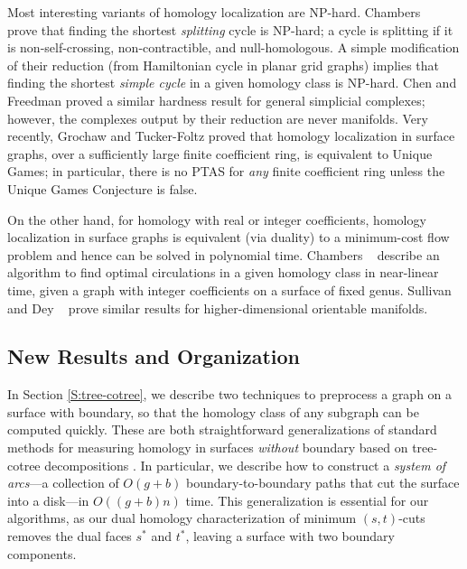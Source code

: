 \documentclass[11pt,twoside]{article}
\begin{document}
Most interesting variants of homology localization are NP-hard.  Chambers \etal~\cite{ccelw-scsih-08} prove that finding the shortest \emph{splitting} cycle is {NP}-hard; a cycle is splitting if it is non-self-crossing, non-contractible, and null-homologous.  A simple modification of their reduction (from Hamiltonian cycle in planar grid graphs) implies that finding the shortest \emph{simple cycle} in a given homology class is {NP}-hard.  Chen and Freedman \cite{cf-qhc-08, cf-qhc2-07} proved a similar hardness result for general simplicial complexes; however, the complexes output by their reduction are never manifolds.  Very recently, Grochaw and Tucker-Foltz \cite{gt-ctugc-18} proved that homology localization in surface graphs, over a sufficiently large finite coefficient ring, is equivalent to Unique Games; in particular, there is no PTAS for \emph{any} finite coefficient ring unless the Unique Games Conjecture is false.

On the other hand, for homology with real or integer coefficients, homology localization in surface graphs is equivalent (via duality) to a minimum-cost flow problem and hence can be solved in polynomial time.  Chambers \etal~\cite{cen-hfcc-12} describe an algorithm to find optimal circulations in a given homology class in near-linear time, given a graph with integer coefficients on a surface of fixed genus.  Sullivan \cite{s-cath-90} and Dey \etal\ \cite{dhk-ohctu-11} prove similar results for higher-dimensional orientable manifolds.

\subsection{New Results and Organization}

In Section \ref{S:tree-cotree}, we describe two techniques to preprocess a graph on a surface with boundary, so that the homology class of any subgraph can be computed quickly.  These are both straightforward generalizations of standard methods for measuring homology in surfaces \emph{without} boundary based on tree-cotree decompositions \cite{ew-gohhg-05, ccelw-scsih-08, e-dgteg-03}.  In particular, we describe how to construct a \emph{system of arcs}---a collection of $O(g+b)$ boundary-to-boundary paths that cut the surface into a disk---in $O((g+b)n)$ time.  This generalization is essential for our algorithms, as our dual homology characterization of minimum $(s,t)$-cuts removes the dual faces $s^*$ and $t^*$, leaving a surface with two boundary components.
\end{document}
